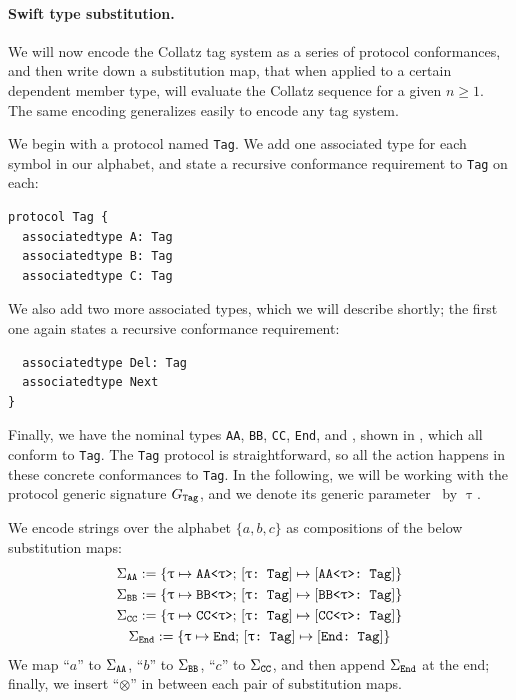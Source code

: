 \documentclass[../generics]{subfiles}
\begin{document}
\newcommand{\AssocTypeA}{\AssocType{Tag}{A}}
\newcommand{\AssocTypeB}{\AssocType{Tag}{B}}
\newcommand{\AssocTypeC}{\AssocType{Tag}{C}}
\newcommand{\AssocTypeDel}{\AssocType{Tag}{Del}}
\newcommand{\AssocTypeNext}{\AssocType{Tag}{Next}}

\paragraph{Swift type substitution.}
We will now encode the Collatz tag system as a series of protocol conformances, and then write down a substitution map, that when applied to a certain dependent member type, will evaluate the Collatz sequence for a given $n \geq 1$. The same encoding generalizes easily to encode any tag system.

We begin with a protocol named \texttt{Tag}. We add one associated type for each symbol in our alphabet, and state a recursive conformance requirement to \texttt{Tag} on each:
\begin{Verbatim}
protocol Tag {
  associatedtype A: Tag
  associatedtype B: Tag
  associatedtype C: Tag
\end{Verbatim}
We also add two more associated types, which we will describe shortly; the first one again states a recursive conformance requirement:
\begin{Verbatim}
  associatedtype Del: Tag
  associatedtype Next
}
\end{Verbatim}
Finally, we have the nominal types \texttt{AA}, \texttt{BB}, \texttt{CC}, \texttt{End}, and \Halt, shown in , which all conform to \texttt{Tag}. The \texttt{Tag} protocol is straightforward, so all the action happens in these concrete conformances to \texttt{Tag}. In the following, we will be working with the protocol generic signature $G_\texttt{Tag}$, and we denote its generic parameter \rT\ by $\uptau$.

\begin{listing}\label{collatz listing}
\end{listing}

\begin{definition}
We encode strings over the alphabet $\{a,b,c\}$ as compositions of the below substitution maps:
\begin{gather*}
\Sigma_{\texttt{AA}} := \{\texttt{$\uptau$} \mapsto \texttt{AA<$\uptau$>};\,[\texttt{$\uptau$:~Tag}] \mapsto [\texttt{AA<$\uptau$>:~Tag}]\}\\
\Sigma_{\texttt{BB}} := \{\texttt{$\uptau$} \mapsto \texttt{BB<$\uptau$>};\,[\texttt{$\uptau$:~Tag}] \mapsto [\texttt{BB<$\uptau$>:~Tag}]\}\\
\Sigma_{\texttt{CC}} := \{\texttt{$\uptau$} \mapsto \texttt{CC<$\uptau$>};\,[\texttt{$\uptau$:~Tag}] \mapsto [\texttt{CC<$\uptau$>:~Tag}]\}\\
\Sigma_{\texttt{End}} := \{\texttt{$\uptau$} \mapsto \texttt{End};\,[\texttt{$\uptau$:~Tag}] \mapsto [\texttt{End:~Tag}]\}
\end{gather*}
We map ``$a$'' to $\Sigma_{\texttt{AA}}$, ``$b$'' to $\Sigma_{\texttt{BB}}$, ``$c$'' to $\Sigma_{\texttt{CC}}$, and then append $\Sigma_{\texttt{End}}$ at the end; finally, we insert ``$\otimes$'' in between each pair of substitution maps.
\end{definition}
\end{document}
